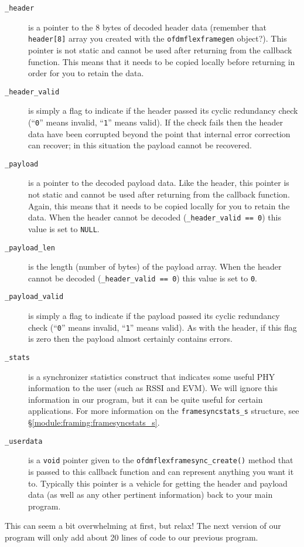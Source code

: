 \begin{description}
\item[{\tt \_header}]
    is a pointer to the 8 bytes of decoded header data
    (remember that {\tt header[8]} array you created with the
    {\tt ofdmflexframegen} object?).
    This pointer is not static and cannot be used after returning from
    the callback function.
    This means that it needs to be copied locally before returning
    in order for you to retain the data.
\item[{\tt \_header\_valid}]
    is simply a flag to indicate if the header passed its cyclic
    redundancy check
    (``{\tt 0}'' means invalid, ``{\tt 1}'' means valid).
    If the check fails then the header data have been corrupted beyond
    the point that internal error correction can recover;
    in this situation the payload cannot be recovered.
\item[{\tt \_payload}]
    is a pointer to the decoded payload data.
    Like the header,
    this pointer is not static and cannot be used after returning from
    the callback function.
    Again, this means that it needs to be copied locally for you to retain the
    data.
    When the header cannot be decoded ({\tt \_header\_valid == 0})
    this value is set to {\tt NULL}.
\item[{\tt \_payload\_len}]
    is the length (number of bytes) of the payload array.
    When the header cannot be decoded ({\tt \_header\_valid == 0})
    this value is set to {\tt 0}.
\item[{\tt \_payload\_valid}]
    is simply a flag to indicate if the payload passed its cyclic
    redundancy check
    (``{\tt 0}'' means invalid, ``{\tt 1}'' means valid).
    As with the header,
    if this flag is zero then the payload almost certainly contains
    errors.
\item[{\tt \_stats}]
    is a synchronizer statistics construct that indicates some useful
    PHY information to the user (such as RSSI and EVM).
    We will ignore this information in our program, but it can be quite
    useful for certain applications.
    For more information on the {\tt framesyncstats\_s} structure, see
    \S\ref{module:framing:framesyncstats_s}.
\item[{\tt \_userdata}]
    is a {\tt void} pointer given to the
    {\tt ofdmflexframesync\_create()} method
    that is passed to this callback function and can represent anything
    you want it to.
    Typically this pointer is a vehicle for getting the header and
    payload data (as well as any other pertinent information)
    back to your main program.
\end{description}
%
This can seem a bit overwhelming at first, but relax!
The next version of our program will only add about 20 lines of code to
our previous program.

